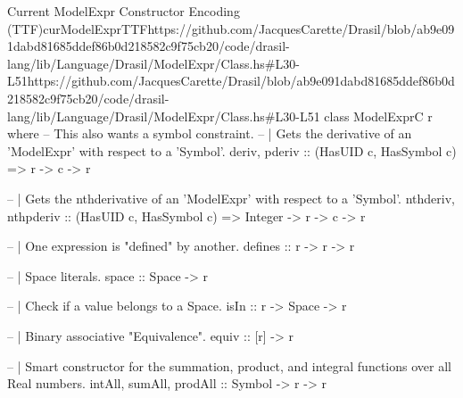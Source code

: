\begin{haskell}{Current ModelExpr Constructor Encoding (TTF)}{curModelExprTTF}{https://github.com/JacquesCarette/Drasil/blob/ab9e091dabd81685ddef86b0d218582c9f75c\newline{}b20/code/drasil-lang/lib/Language/Drasil/ModelExpr/Class.hs\#L30-L51}{https://github.com/JacquesCarette/Drasil/blob/ab9e091dabd81685ddef86b0d218582c9f75cb20/code/drasil-lang/lib/Language/Drasil/ModelExpr/Class.hs\#L30-L51}
class ModelExprC r where
  -- This also wants a symbol constraint.
  -- | Gets the derivative of an 'ModelExpr' with respect to a 'Symbol'.
  deriv, pderiv :: (HasUID c, HasSymbol c) => r -> c -> r
  
  -- | Gets the nthderivative of an 'ModelExpr' with respect to a 'Symbol'.
  nthderiv, nthpderiv :: (HasUID c, HasSymbol c) => Integer -> r -> c -> r
  
  -- | One expression is "defined" by another.
  defines :: r -> r -> r
  
  -- | Space literals.
  space :: Space -> r
  
  -- | Check if a value belongs to a Space.
  isIn :: r -> Space -> r
  
  -- | Binary associative "Equivalence".
  equiv :: [r] -> r
  
  -- | Smart constructor for the summation, product, and integral functions over all Real numbers.
  intAll, sumAll, prodAll :: Symbol -> r -> r
\end{haskell}
